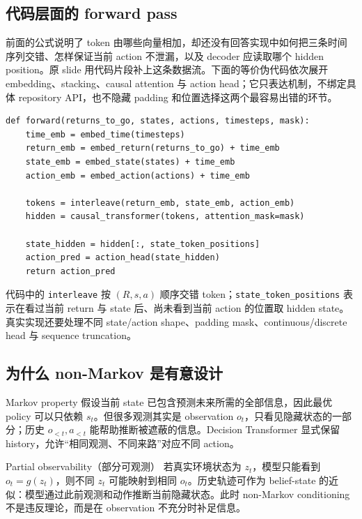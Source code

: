 \subsection{代码层面的 forward pass}

前面的公式说明了 token 由哪些向量相加，却还没有回答实现中如何把三条时间序列交错、怎样保证当前 action 不泄漏，以及 decoder 应读取哪个 hidden position。原 slide 用代码片段补上这条数据流。下面的等价伪代码依次展开 embedding、stacking、causal attention 与 action head；它只表达机制，不绑定具体 repository API，也不隐藏 padding 和位置选择这两个最容易出错的环节。


\begin{lstlisting}[caption={Decision Transformer forward pass 的最小伪代码},label={lst:dt-forward}]
def forward(returns_to_go, states, actions, timesteps, mask):
    time_emb = embed_time(timesteps)
    return_emb = embed_return(returns_to_go) + time_emb
    state_emb = embed_state(states) + time_emb
    action_emb = embed_action(actions) + time_emb

    tokens = interleave(return_emb, state_emb, action_emb)
    hidden = causal_transformer(tokens, attention_mask=mask)

    state_hidden = hidden[:, state_token_positions]
    action_pred = action_head(state_hidden)
    return action_pred
\end{lstlisting}

代码中的 \texttt{interleave} 按 $(R,s,a)$ 顺序交错 token；\texttt{state\_token\_positions} 表示在看过当前 return 与 state 后、尚未看到当前 action 的位置取 hidden state。真实实现还要处理不同 state/action shape、padding mask、continuous/discrete head 与 sequence truncation。

\subsection{为什么 non-Markov 是有意设计}

Markov property 假设当前 state 已包含预测未来所需的全部信息，因此最优 policy 可以只依赖 $s_t$。但很多观测其实是 observation $o_t$，只看见隐藏状态的一部分；历史 $o_{<t},a_{<t}$ 能帮助推断被遮蔽的信息。Decision Transformer 显式保留 history，允许“相同观测、不同来路”对应不同 action。

\begin{knowledgebox}{Partial observability（部分可观测）}
若真实环境状态为 $z_t$，模型只能看到 $o_t=g(z_t)$，则不同 $z_t$ 可能映射到相同 $o_t$。历史轨迹可作为 belief-state 的近似：模型通过此前观测和动作推断当前隐藏状态。此时 non-Markov conditioning 不是违反理论，而是在 observation 不充分时补足信息。
\end{knowledgebox}

